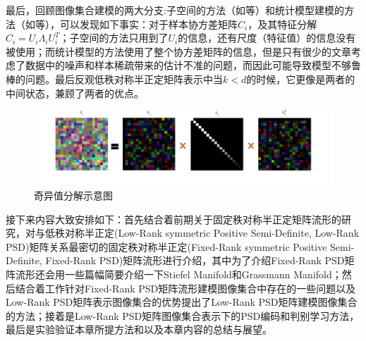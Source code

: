 最后，回顾图像集合建模的两大分支:子空间的方法（如\cite{Subspace_GDA,Subspace_MSM}等）和统计模型建模的方法（如\cite{Statistics_CDL,Statistics_Vemu,Statistics_SPDML,Statistics_LMKML,Statistics_HERML,Statistics_DARG}等），可以发现如下事实：对于样本协方差矩阵$C_{i}$，及其特征分解$C_{i}=U_{i}\Lambda_{i} U^{T}_{i}$；子空间的方法只用到了$U_{i}$的信息，还有尺度（特征值）的信息没有被使用；而统计模型的方法使用了整个协方差矩阵的信息，但是只有很少的文章考虑了数据中的噪声和样本稀疏带来的估计不准的问题，而因此可能导致模型不够鲁棒的问题。最后反观低秩对称半正定矩阵表示中当$k<d$的时候，它更像是两者的中间状态，兼顾了两者的优点。
\begin{figure}[hbt]
	\centering
	\includegraphics[width=0.95\linewidth]{source/svd_decomposition.png}
	\caption{奇异值分解示意图}
	\label{fig:SVD_Decomposition}
\end{figure}

接下来内容大致安排如下：首先结合着前期关于固定秩对称半正定矩阵流形的研究，对与低秩对称半正定(Low-Rank symmetric Positive Semi-Definite, Low-Rank PSD)矩阵关系最密切的固定秩对称半正定(Fixed-Rank symmetric Positive Semi-Definite, Fixed-Rank PSD)矩阵流形进行介绍，其中为了介绍Fixed-Rank PSD矩阵流形还会用一些篇幅简要介绍一下Stiefel Manifold和Grassmann Manifold；然后结合着工作\cite{PSD_WACV}针对Fixed-Rank PSD矩阵流形建模图像集合中存在的一些问题以及Low-Rank PSD矩阵表示图像集合的优势提出了Low-Rank PSD矩阵建模图像集合的方法；接着是Low-Rank PSD矩阵图像集合表示下的PSD编码和判别学习方法，最后是实验验证本章所提方法和以及本章内容的总结与展望。

